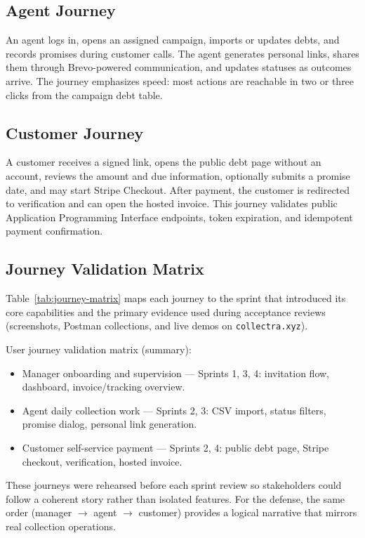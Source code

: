 ﻿\documentclass[12pt,a4paper]{report}
\begin{document}
\subsection{Agent Journey}

An agent logs in, opens an assigned campaign, imports or updates debts, and records promises
during customer calls.
The agent generates personal links, shares them through Brevo-powered communication, and updates
statuses as outcomes arrive.
The journey emphasizes speed: most actions are reachable in two or three clicks from the campaign
debt table.

\subsection{Customer Journey}

A customer receives a signed link, opens the public debt page without an account, reviews the
amount and due information, optionally submits a promise date, and may start Stripe Checkout.
After payment, the customer is redirected to verification and can open the hosted invoice.
This journey validates public Application Programming Interface endpoints, token expiration, and
idempotent payment confirmation.

\subsection{Journey Validation Matrix}

Table~\ref{tab:journey-matrix} maps each journey to the sprint that introduced its core
capabilities and the primary evidence used during acceptance reviews (screenshots, Postman
collections, and live demos on \texttt{collectra.xyz}).

\noindent User journey validation matrix (summary):

\begin{itemize}
  \item Manager onboarding and supervision — Sprints 1, 3, 4: invitation flow, dashboard, invoice/tracking overview.
  \item Agent daily collection work — Sprints 2, 3: CSV import, status filters, promise dialog, personal link generation.
  \item Customer self-service payment — Sprints 2, 4: public debt page, Stripe checkout, verification, hosted invoice.
\end{itemize}

These journeys were rehearsed before each sprint review so stakeholders could follow a coherent
story rather than isolated features.
For the defense, the same order (manager $\rightarrow$ agent $\rightarrow$ customer) provides a
logical narrative that mirrors real collection operations.
\end{document}
